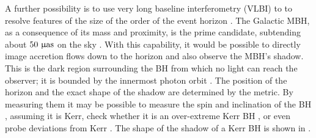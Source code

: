 
A further possibility is to use very long baseline interferometry (VLBI) to to resolve features of the size of the order of the event horizon \citep{Doeleman2008}. The Galactic MBH, as a consequence of its mass and proximity, is the prime candidate, subtending about $50~\mathrm{\upmu as}$ on the sky \citep{Broderick2009}. With this capability, it would be possible to directly image accretion flows down to the horizon and also observe the MBH's shadow. This is the dark region surrounding the BH from which no light can reach the observer; it is bounded by the innermost photon orbit \citep[section 63]{Chandrasekhar1992}. The position of the horizon and the exact shape of the shadow are determined by the metric. By measuring them it may be possible to measure the spin and inclination of the BH \citep{Hioki2009a}, assuming it is Kerr, check whether it is an over-extreme Kerr BH \citep{Bambi2009}, or even probe deviations from Kerr \citep{Johannsen2010a, Johannsen2010b}.%
The shape of the shadow of a Kerr BH is shown in .
